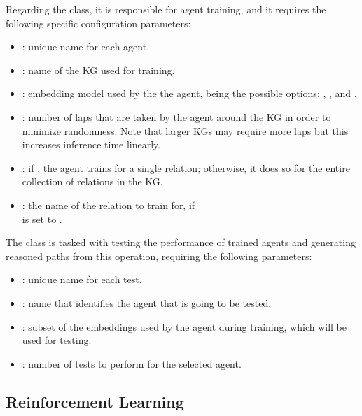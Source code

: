 Regarding the  class, it is responsible for agent training, and it requires the following specific configuration parameters: 
\begin{itemize}
    \item {}: unique name for each agent.
    \item {}: name of the KG used for training.
    \item {}:  embedding model used by the the agent, being the possible options: , ,  and .
    \item {}: number of laps that are taken by the agent around the KG in order to minimize randomness. Note that larger KGs may require more laps but this increases inference time linearly. 
    \item {}: if , the agent trains for a single relation; otherwise, it does so for the entire collection of relations in the KG.
    \item {}: the name of the relation to train for, if \\ is set to .
\end{itemize}

The  class is tasked with testing the performance of trained agents and generating reasoned paths from this operation, requiring the following parameters:

\begin{itemize}
    \item {}: unique name for each test.
    \item {}: name that identifies the agent that is going to be tested.
    \item {}: subset of the embeddings used by the agent during training, which will be used for testing.
    \item {}: number of tests to perform for the selected agent.
\end{itemize}

\subsection{Reinforcement Learning}\label{sec:framework-reinforcement} 


